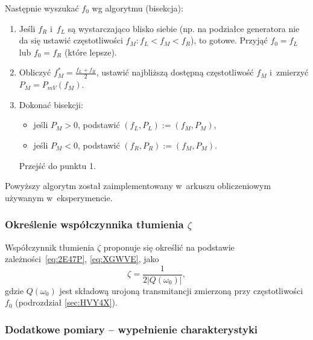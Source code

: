 \documentclass[paper=a4,DIV=12]{lpas}
\begin{document}
\begin{appendices}
  Następnie wyszukać $f_0$ wg algorytmu (bisekcja):
  \begin{enumerate}
    \item Jeśli $f_R$ i~$f_L$ są wystarczająco blisko siebie (np. na podziałce
      generatora nie da się ustawić częstotliwości $f_M: f_L < f_M < f_R$), to
      gotowe. Przyjąć $f_0 = f_L$ lub $f_0 = f_R$ (które lepsze).
    \item Obliczyć $f_M^{*} = \frac{f_L + f_R}{2}$, ustawić najbliższą dostępną
      częstotliwość $f_M$ i~zmierzyć $P_M = P_{mV}(f_M)$.
    \item Dokonać bisekcji:
      \begin{itemize}
        \item jeśli $P_M > 0$, podstawić $(f_L, P_L) := (f_M, P_M)$,
        \item jeśli $P_M < 0$, podstawić $(f_R, P_R) := (f_M, P_M)$.
      \end{itemize}
      Przejść do punktu 1.
  \end{enumerate}
  Powyższy algorytm został zaimplementowany w~arkuszu obliczeniowym używanym
  w~eksperymencie.

  \subsubsection{Określenie współczynnika tłumienia \texorpdfstring{$\zeta$}{ζ}}
  \label{sec:L7DED}

  Współczynnik tłumienia $\zeta$ proponuje się określić na podstawie
  zależności~\eqref{eq:2E47P}, \eqref{eq:XGWVE}, jako
  \begin{equation}
    \zeta = \frac{1}{2 |Q(\omega_0)|},
    \label{eq:G616R}
  \end{equation}
  gdzie $Q(\omega_0)$ jest składową urojoną transmitancji zmierzoną przy
  częstotliwości $f_0$ (podrozdział \ref{sec:HVY4X}).

  \subsubsection{Dodatkowe pomiary -- wypełnienie charakterystyki}
  \label{sec:X9JYP}


\end{appendices}
\end{document}
